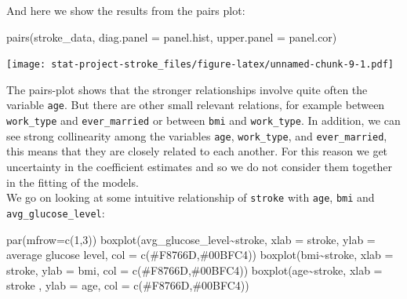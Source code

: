 \documentclass[
]{article}
\newenvironment{Shaded}{\begin{snugshade}}{\end{snugshade}}
\newcommand{\AttributeTok}[1]{\textcolor[rgb]{0.77,0.63,0.00}{#1}}
\newcommand{\DecValTok}[1]{\textcolor[rgb]{0.00,0.00,0.81}{#1}}
\newcommand{\FunctionTok}[1]{\textcolor[rgb]{0.00,0.00,0.00}{#1}}
\newcommand{\NormalTok}[1]{#1}
\newcommand{\SpecialCharTok}[1]{\textcolor[rgb]{0.00,0.00,0.00}{#1}}
\newcommand{\StringTok}[1]{\textcolor[rgb]{0.31,0.60,0.02}{#1}}
\begin{document}
And here we show the results from the pairs plot:

\begin{Shaded}
\begin{Highlighting}[]
\FunctionTok{pairs}\NormalTok{(stroke\_data, }\AttributeTok{diag.panel =}\NormalTok{ panel.hist, }\AttributeTok{upper.panel =}\NormalTok{ panel.cor)}
\end{Highlighting}
\end{Shaded}

\texttt{[image: stat-project-stroke\_files/figure-latex/unnamed-chunk-9-1.pdf]}

The pairs-plot shows that the stronger relationships involve quite often
the variable \texttt{age}. But there are other small relevant relations,
for example between \texttt{work\_type} and \texttt{ever\_married} or
between \texttt{bmi} and \texttt{work\_type}. In addition, we can see
strong collinearity among the variables \texttt{age},
\texttt{work\_type}, and \texttt{ever\_married}, this means that they
are closely related to each another. For this reason we get uncertainty
in the coefficient estimates and so we do not consider them together in
the fitting of the models.\\
We go on looking at some intuitive relationship of \texttt{stroke} with
\texttt{age}, \texttt{bmi} and \texttt{avg\_glucose\_level}:

\begin{Shaded}
\begin{Highlighting}[]
\FunctionTok{par}\NormalTok{(}\AttributeTok{mfrow=}\FunctionTok{c}\NormalTok{(}\DecValTok{1}\NormalTok{,}\DecValTok{3}\NormalTok{))}
\FunctionTok{boxplot}\NormalTok{(avg\_glucose\_level}\SpecialCharTok{\textasciitilde{}}\NormalTok{stroke, }\AttributeTok{xlab =} \StringTok{\textquotesingle{}stroke\textquotesingle{}}\NormalTok{, }
        \AttributeTok{ylab =} \StringTok{\textquotesingle{}average glucose level\textquotesingle{}}\NormalTok{, }\AttributeTok{col =} \FunctionTok{c}\NormalTok{(}\StringTok{\textquotesingle{}\#F8766D\textquotesingle{}}\NormalTok{,}\StringTok{\textquotesingle{}\#00BFC4\textquotesingle{}}\NormalTok{))}
\FunctionTok{boxplot}\NormalTok{(bmi}\SpecialCharTok{\textasciitilde{}}\NormalTok{stroke, }\AttributeTok{xlab =} \StringTok{\textquotesingle{}stroke\textquotesingle{}}\NormalTok{, }\AttributeTok{ylab =} \StringTok{\textquotesingle{}bmi\textquotesingle{}}\NormalTok{, }\AttributeTok{col =} \FunctionTok{c}\NormalTok{(}\StringTok{\textquotesingle{}\#F8766D\textquotesingle{}}\NormalTok{,}\StringTok{\textquotesingle{}\#00BFC4\textquotesingle{}}\NormalTok{))}
\FunctionTok{boxplot}\NormalTok{(age}\SpecialCharTok{\textasciitilde{}}\NormalTok{stroke, }\AttributeTok{xlab =} \StringTok{\textquotesingle{}stroke\textquotesingle{}}\NormalTok{ , }\AttributeTok{ylab =} \StringTok{\textquotesingle{}age\textquotesingle{}}\NormalTok{, }\AttributeTok{col =} \FunctionTok{c}\NormalTok{(}\StringTok{\textquotesingle{}\#F8766D\textquotesingle{}}\NormalTok{,}\StringTok{\textquotesingle{}\#00BFC4\textquotesingle{}}\NormalTok{))}
\end{Highlighting}
\end{Shaded}
\end{document}
